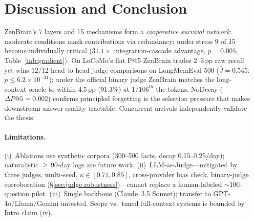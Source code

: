 \documentclass{article}
\begin{document}
\label{sec:competitive}

\section{Discussion and Conclusion}
\label{sec:discussion}

ZenBrain's 7 layers and 15 mechanisms form a \emph{cooperative
survival network}: moderate conditions mask contributions via
redundancy; under stress 9 of 15 become individually critical
($31.1\times$ integration-cascade advantage, $p{=}0.005$,
Table~\ref{tab:gradient}). On LoCoMo's flat P@5 ZenBrain trades
$2$--$3$\,pp raw recall yet wins $12/12$ head-to-head judge
comparisons on LongMemEval-500
($\bar{J}{=}0.545$; $p{\leq}6.2{\times}10^{-31}$); under the official
binary judge ZenBrain matches the long-context oracle to within
$4.5$\,pp ($91.3\%$) at $1/106^\text{th}$ the tokens. NoDecay
($\Delta P@5{=}0.002$) confirms principled forgetting is the selection
pressure that makes downstream answer quality tractable. Concurrent
arrivals
\citep{du2026memory,karpathy2026knowledge,anthropic2026autodream,tiwari2026multilayered,iclr2026memagents}
independently validate the thesis.

\paragraph{Limitations.}\label{sec:limitations}
(i)~Ablations use synthetic corpora (300--500 facts, decay
0.15--0.25/day); naturalistic $\geq$\,90-day logs are future work.
(ii)~LLM-as-Judge---mitigated by three judges, multi-seed,
$\kappa{\in}[0.71,0.85]$, cross-provider bias check, binary-judge
corroboration (\S\ref{sec:judge-robustness})---cannot replace a
human-labeled $\sim$100-question pilot.
(iii)~Single backbone (Claude~3.5 Sonnet); transfer to
GPT-4o/Llama/Gemini untested. Scope vs.\ tuned full-context systems
is bounded by Intro claim (iv).

\end{document}

